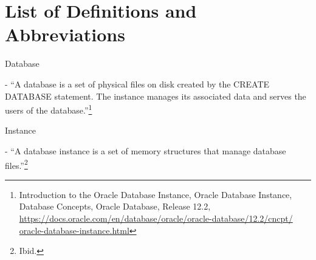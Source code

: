 

\newpage
\setcounter{secnumdepth}{0}
\section{List of Definitions and Abbreviations}

\noindent\begin{itemize*}


\item{\begin{bf}Database\end{bf}} - ``A database is a set of physical
  files on disk created by the CREATE DATABASE statement. The instance
  manages its associated data and serves the users of the database.''\footnote{Introduction to the Oracle Database Instance, Oracle Database Instance, Database Concepts, Oracle Database,
    Release 12.2,
    \href{https://docs.oracle.com/en/database/oracle/oracle-database/12.2/cncpt/oracle-database-instance.html}{https://docs.oracle.com/en/database/oracle/oracle-database/12.2/cncpt/}\newline
  \href{http://www.google.com}{oracle-database-instance.html}}


\item{\begin{bf}Instance\end{bf}} - ``A database instance
  is a set of memory structures that manage database files.''\footnote{Ibid.}

\end{itemize*}




